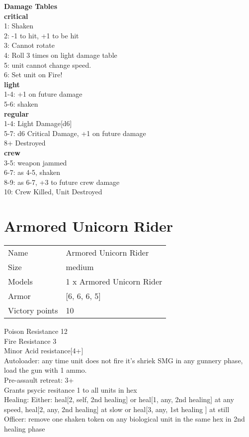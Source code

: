  





{\bf Damage Tables} \\
 {\bf critical } \\
1: Shaken \\
2: -1 to hit, +1 to be hit \\
3: Cannot rotate \\
4: Roll 3 times on light damage table \\
5: unit cannot change speed. \\
6: Set unit on Fire! \\
 {\bf light } \\
1-4: +1 on future damage \\
5-6: shaken \\
 {\bf regular } \\
1-4: Light Damage[d6] \\
5-7: d6 Critical Damage, +1 on future damage \\
8+ Destroyed \\
 {\bf crew } \\
3-5: weapon jammed \\
6-7: as 4-5, shaken \\
8-9: as 6-7, +3 to future crew damage \\
10: Crew Killed, Unit Destroyed \\










\pagebreak\pagebreak

\section{ Armored Unicorn Rider }

\begin{tabular}{ll}
  Name & Armored Unicorn Rider \\
  Size & medium\\
  Models & 1 x Armored Unicorn Rider\\
  Armor & [6, 6, 6, 5]\\
  Victory points & 10\\
\end{tabular}

Poison Resistance 12\\ 
Fire Resistance 3\\ 
Minor Acid resistance[4+]\\ 
Autoloader: any time unit does not fire it's shriek SMG in any gunnery phase, load the gun with 1 ammo.\\ 
Pre-assault retreat: 3+\\ 
Grants psycic resitance 1 to all units in hex\\ 
Healing: Either: heal[2, self, 2nd healing] or heal[1, any, 2nd healing] at any speed, heal[2, any, 2nd healing] at slow or heal[3, any, 1st healing ] at still\\ 
Officer: remove one shaken token on any biological unit in the same hex in 2nd healing  phase\\ 


